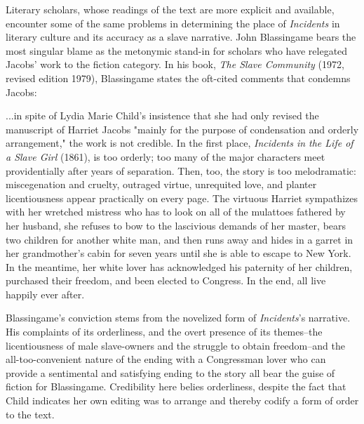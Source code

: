 Literary scholars, whose readings of the text are more explicit and available, encounter some of the same problems in determining the place of \textit{Incidents} in literary culture and its accuracy as a slave narrative. John Blassingame bears the most singular blame as the metonymic stand-in for scholars who have relegated Jacobs' work to the fiction category. In his book, \textit{The Slave Community} (1972, revised edition 1979), Blassingame states the oft-cited comments that condemns Jacobs: 
\begin{displayquote}
...in spite of Lydia Marie Child's insistence that she had only revised the manuscript of Harriet Jacobs "mainly for the purpose of condensation and orderly arrangement," the work is not credible. In the first place, \textit{Incidents in the Life of a Slave Girl} (1861), is too orderly; too many of the major characters meet providentially after years of separation. Then, too, the story is too melodramatic: miscegenation and cruelty, outraged virtue, unrequited love, and planter licentiousness appear practically on every page. The virtuous Harriet sympathizes with her wretched mistress who has to look on all of the mulattoes fathered by her husband, she refuses to bow to the lascivious demands of her master, bears two children for another white man, and then runs away and hides in a garret in her grandmother's cabin for seven years until she is able to escape to New York. In the meantime, her white lover has acknowledged his paternity of her children, purchased their freedom, and been elected to Congress. In the end, all live happily ever after.\autocite[373]{blassingame_slave_1979}
\end{displayquote}
Blassingame's conviction stems from the novelized form of \textit{Incidents}'s narrative. His complaints of its orderliness, and the overt presence of its themes--the licentiousness of male slave-owners and the struggle to obtain freedom--and the all-too-convenient nature of the ending with a Congressman lover who can provide a sentimental and satisfying ending to the story all bear the guise of fiction for Blassingame. Credibility here belies orderliness, despite the fact that Child indicates her own editing was to arrange and thereby codify a form of order to the text.

